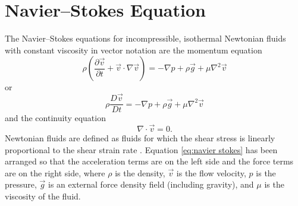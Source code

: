 \documentclass[a4paper, 12pt, oneside]{book}
\begin{document}
\section{Navier--Stokes Equation}

\begin{doublespace}
    The Navier--Stokes equations for incompressible, isothermal Newtonian fluids with constant viscosity \cite{munson2013, gerhart2016} in vector notation are the momentum equation
    \begin{equation}
        \label{eq:navier stokes}
        \rho ( \frac{\partial \vec{v}} {\partial t} + \vec{v} \cdot \nabla \vec{v} ) = - \nabla p + \rho \vec{g} + \mu \nabla^{2} \vec{v}
    \end{equation}
     or
    \begin{equation}
        \label{eq:alt navier stokes}
        \rho \frac{D \vec{v}} {D t} = - \nabla p + \rho \vec{g} + \mu \nabla^{2} \vec{v}
    \end{equation}
    and the continuity equation
    \begin{equation}
        \nabla \cdot \vec{v} = 0 .
    \end{equation}
    Newtonian fluids are defined as fluids for which the shear stress is linearly proportional to the shear strain rate \cite[465]{cengel2014}. Equation \ref{eq:navier stokes} has been arranged so that the acceleration terms are on the left side and the force terms are on the right side, where \(\rho\) is the density, \(\vec{v}\) is the flow velocity, \(p\) is the pressure, \(\vec{g}\) is an external force density field (including gravity), and \(\mu\) is the viscosity of the fluid. 
\end{doublespace}
\end{document}
